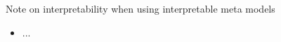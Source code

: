 \documentclass[11pt,compress,t,notes=noshow, aspectratio=169, xcolor=table]{beamer}
\begin{document}


\begin{vbframe}{}
  Note on interpretability when using interpretable meta models

\begin{itemize}
  \item ...
\end{itemize}

\end{vbframe}



\endlecture
\end{document}
